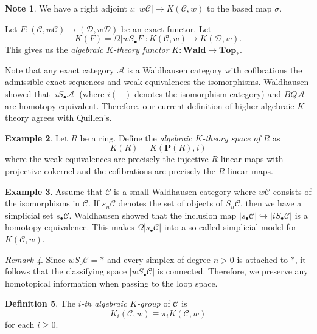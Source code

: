 \documentclass[10pt,letterpaper,cm]{nupset}
\theoremstyle{definition}
\newtheorem{definition}{Definition}
\newtheorem{exmp}[definition]{Example}
\newtheorem{note}[definition]{Note}
\theoremstyle{theorem}
\theoremstyle{remark}
\newtheorem{remark}[definition]{Remark}
\renewcommand{\P}{\mathbf P}
\newcommand{\1}{\mathbf{1}}
\renewcommand{\a}{\mathscr{A}}
\renewcommand{\c}{\mathscr{C}}
\renewcommand{\d}{\mathscr{D}}
\newcommand{\0}{\vec 0}
\begin{document}
\begin{note}
We have a right adjoint $\iota: \left\lvert{w{\c}}\right\rvert \to K(\c, w)$ to the based map $\sigma$.
\end{note}

\medskip


Let $F : \left(\c, w{\c}\right) \to \left(\d, w{\d}\right)$ be an exact functor. Let $$K(F) = \Omega\left\lvert{wS_{\bullet}F}\right\rvert : K(\c, w) \to K(\d, w).$$ This gives us the \textit{algebraic $K$-theory functor} $K : \mathbf{Wald} \to \mathbf{Top_{\ast}}.$

\medskip

Note that any exact category $\a$ is a Waldhausen category with cofibrations the admissible exact sequences and weak equivalences the isomorphisms. Waldhausen showed that $\left\lvert{i{S_{\bullet}\a}}\right\rvert$ (where $i({-})$ denotes the isomorphism category) and $BQ\a$ are homotopy equivalent. Therefore, our current definition of higher algebraic $K$-theory agrees with Quillen's.


\begin{exmp}
Let $R$ be a ring. Define the \textit{algebraic $K$-theory space of $R$} as $$K(R) = K(\P(R), i)$$ where the weak equivalences are precisely the injective $R$-linear maps with projective cokernel and the cofibrations are precisely the $R$-linear maps.
\end{exmp}

\begin{exmp}
Assume that $\c$ is a small Waldhausen category where $w{\c}$ consists of the isomorphisms in $\c$. If $s_n\c$ denotes the set of objects of $S_n \c$, then we have a simplicial set $s_{\bullet} \c$. Waldhausen showed that the inclusion map $\left\lvert{s_{\bullet} \c}\right\rvert \hookrightarrow \left\lvert{iS_{\bullet} \c}\right\rvert$ is a homotopy equivalence. This makes $\Omega |s_{\bullet} \c|$ into a so-called simplicial model for $K(\c, w)$.
\end{exmp}

\begin{remark}
Since $wS_0 \c = \ast$ and every simplex of degree $n >0$ is attached to $\ast$, it follows that the classifying space $\left\lvert{w S_{\bullet} \c}\right\rvert$ is connected. Therefore, we preserve any homotopical information when passing to the loop space.
\end{remark}

\begin{definition}
The \textit{$i$-th algebraic $K$-group} of $\c$ is 
\[
K_i(\c, w) \equiv \pi_iK(\c, w)
\] for each $i\geq 0$. 
\end{definition}
\end{document}
